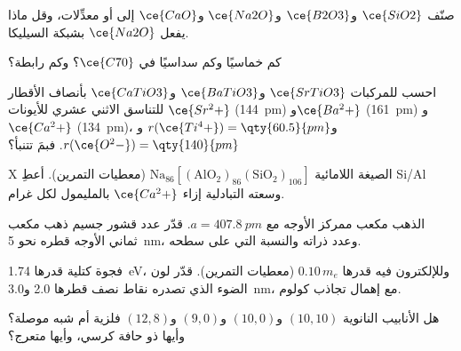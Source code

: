 \begin{exercise}[$\star$]\label{exo:b3:inorganic-materials:3}
صنّف $\ce{SiO2}$ و$\ce{B2O3}$ و$\ce{Na2O}$ و$\ce{CaO}$ إلى  أو معدِّلات، وقل ماذا
يفعل $\ce{Na2O}$ بشبكة السيليكا.
\end{exercise}

\begin{exercise}[$\star$]\label{exo:b3:inorganic-materials:4}
كم خماسيًا وكم سداسيًا في $\ce{C70}$؟ وكم رابطة؟
\end{exercise}

\begin{exercise}[$\star\star$]\label{exo:b3:inorganic-materials:5}
احسب  للمركبات $\ce{SrTiO3}$ و$\ce{BaTiO3}$ و$\ce{CaTiO3}$ بأنصاف الأقطار للتناسق الاثني عشري
للأيونات $\ce{Sr^2+}$ (\qty{144}{pm}) و$\ce{Ba^2+}$ (\qty{161}{pm}) و$\ce{Ca^2+}$ (\qty{134}{pm})، و$r(\ce{Ti^4+}) = \qty{60.5}{pm}$ و$r(\ce{O^2-}) = \qty{140}{pm}$. فبمَ
تتنبأ؟
\end{exercise}

\begin{exercise}[$\star\star$]\label{exo:b3:inorganic-materials:6}
 X الصيغة اللامائية $\mathrm{Na_{86}[(AlO_2)_{86}(SiO_2)_{106}]}$ (معطيات التمرين).
أعطِ Si/Al وسعته التبادلية إزاء $\ce{Ca^2+}$ بالمليمول لكل غرام.
\end{exercise}

\begin{exercise}[$\star\star$]\label{exo:b3:inorganic-materials:7}
الذهب مكعب ممركز الأوجه مع $a = \qty{407.8}{pm}$. قدّر عدد قشور
جسيم ذهب مكعب ثماني الأوجه قطره نحو \qty{5}{nm}، وعدد ذراته 
والنسبة التي على سطحه.
\end{exercise}

\begin{exercise}[$\star\star$]\label{exo:b3:inorganic-materials:8}
 فجوة كتلية قدرها \qty{1.74}{eV}، وللإلكترون  فيه 
قدرها $0.10\,m_e$ (معطيات التمرين). قدّر لون الضوء الذي تصدره
نقاط نصف قطرها 2.0 و\qty{3.0}{nm}، مع إهمال تجاذب كولوم.
\end{exercise}

\begin{exercise}[$\star\star$]\label{exo:b3:inorganic-materials:9}
هل الأنابيب النانوية $(10, 10)$ و$(10, 0)$ و$(9, 0)$ و$(12, 8)$ فلزية أم شبه موصلة؟ وأيها
ذو حافة كرسي، وأيها متعرج؟
\end{exercise}

